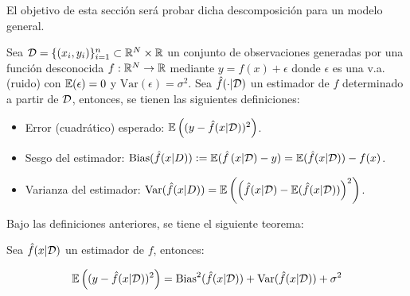 El objetivo de esta sección será probar dicha descomposición para un modelo general.

\begin{definition}
	Sea ${\mathcal D}=\{(x_i,y_i)\}_{i=1}^n\subset\mathbb{R}^N\times\mathbb{R}$ un conjunto de observaciones generadas por una función desconocida $f:\mathbb{R}^N\to\mathbb{R}$ mediante $y=f(x)+\epsilon$ donde $\epsilon$ es una v.a. (ruido) con $\operatorname{\mathbb{E}}(\epsilon)=0$ y $\text{Var}(\epsilon)=\sigma^2$. Sea $\hat{f}(\cdot|{\mathcal D})$ un estimador de $f$ determinado a partir de ${\mathcal D}$, entonces, se tienen las siguientes definiciones:
	
	\begin{itemize}
		\item Error (cuadrático) esperado: $\operatorname{\mathbb{E}}\left((y-\hat{f}(x|{\mathcal D}))^2\right)$.
		\item Sesgo del estimador: $\text{Bias}(\hat{f}(x|D)):=\operatorname{\mathbb{E}}(\hat{f}\left(x|{\mathcal D}) - y\right) = \operatorname{\mathbb{E}}(\hat{f}(x|{\mathcal D})) - f(x)$.
		\item Varianza del estimador: $\text{Var}(\hat{f}(x|D)) = \operatorname{\mathbb{E}}\left(\left(\hat{f}(x|{\mathcal D})-\operatorname{\mathbb{E}}(\hat{f}(x|{\mathcal D}))\right)^2\right)$.
		
	\end{itemize}
\end{definition}

Bajo las definiciones anteriores, se tiene el siguiente teorema:

\begin{theorem} Sea $\hat{f}(x|{\mathcal D})$ un estimador de $f$, entonces:

\begin{equation}
	\operatorname{\mathbb{E}}\left((y-\hat{f}(x|{\mathcal D}))^2\right) = \text{Bias}^2(\hat{f}(x|{\mathcal D})) + \text{Var}(\hat{f}(x|{\mathcal D})) + \sigma^2
\end{equation}
	
\end{theorem}

